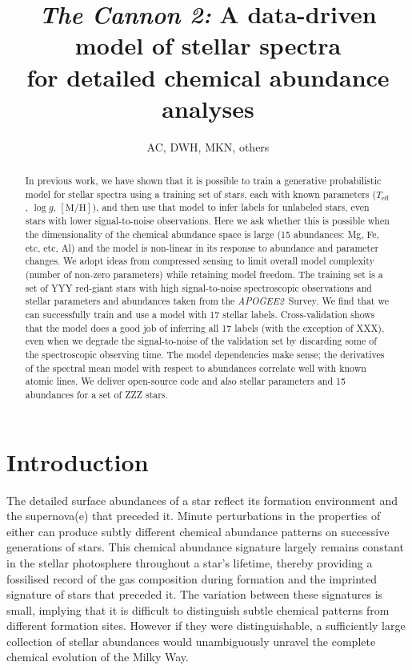 \documentclass[12pt,preprint]{aastex}
\newcommand{\project}[1]{\textsl{#1}}
\newcommand{\acronym}[1]{{\small{#1}}}
\newcommand{\apogee}{\project{\acronym{APOGEE2}}}
\newcommand{\logg}{\log g}
\newcommand{\mh}{\mathrm{[M/H]}}
\newcommand{\Teff}{T_{\mathrm{eff}}}
\begin{document}
\title{\textsl{The Cannon 2:} A data-driven model of stellar spectra \\
       for detailed chemical abundance analyses}
\author{AC, DWH, MKN, others}

\begin{abstract}
In previous work, we have shown that it is possible to train a generative
probabilistic model for stellar spectra using a training set of stars, each with known
parameters ($\Teff$, $\logg$, $\mh$), and then use that model to infer labels for
unlabeled stars, even stars with lower signal-to-noise observations.
Here we ask whether this is possible when the dimensionality of the chemical
abundance space is large (15 abundances: Mg, Fe, etc, etc, Al)
and the model is non-linear in its response to abundance and parameter changes.
We adopt ideas from compressed sensing to limit overall model complexity (number
of non-zero parameters) while retaining model freedom.
The training set is a set of YYY red-giant stars with high signal-to-noise
spectroscopic observations and stellar parameters and abundances taken from the
\apogee\ Survey.
We find that we can successfully train and use a model with 17 stellar labels.
Cross-validation shows that the model does a good job of inferring all 17 labels
(with the exception of XXX), even when we degrade the signal-to-noise of the
validation set by discarding some of the spectroscopic observing time.
The model dependencies make sense; the derivatives of the spectral mean model
with respect to abundances correlate well with known atomic lines.
We deliver open-source code and also stellar parameters and 15 abundances for a
set of ZZZ stars.
\end{abstract}

\section{Introduction}


The detailed surface abundances of a star reflect its formation environment
and the supernova(e) that preceded it.  Minute perturbations in the properties
of either can produce subtly different chemical abundance patterns on successive
generations of stars.  This chemical abundance signature largely remains 
constant in the stellar photosphere throughout a star's lifetime, thereby 
providing a fossilised record of the gas composition during formation and the 
imprinted signature of stars that preceded it.  The variation between these
signatures is small, implying that it is difficult to distinguish subtle 
chemical patterns from different formation sites.  However if they were 
distinguishable, a sufficiently large collection of stellar abundances would 
unambiguously unravel the complete chemical evolution of the Milky Way.
\end{document}
